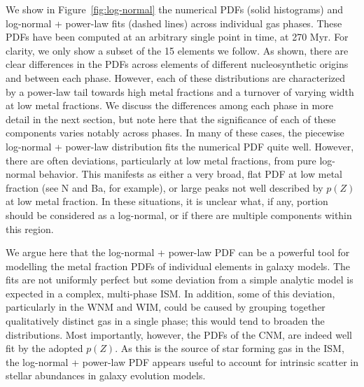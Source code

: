 \documentclass[twocolumn]{aastex61}
\begin{document}
We show in Figure~\ref{fig:log-normal} the numerical PDFs (solid histograms) and log-normal + power-law fits (dashed lines) across individual gas phases. These PDFs have been computed at an arbitrary single point in time, at 270 Myr. For clarity, we only show a subset of the 15 elements we follow. As shown, there are clear differences in the PDFs across elements of different nucleosynthetic origins and between each phase. However, each of these distributions are characterized by a power-law tail towards high metal fractions and a turnover of varying width at low metal fractions. We discuss the differences among each phase in more detail in the next section, but note here that the significance of each of these components varies notably across phases. In many of these cases, the piecewise log-normal + power-law distribution fits the numerical PDF quite well. However, there are often deviations, particularly at low metal fractions, from pure log-normal behavior. This manifests as either a very broad, flat PDF at low metal fraction (see N and Ba, for example), or large peaks not well described by $p(Z)$ at low metal fraction. In these situations, it is unclear what, if any, portion should be considered as a log-normal, or if there are multiple components within this region.

We argue here that the log-normal + power-law PDF can be a powerful tool for modelling the metal fraction  PDFs of individual elements in galaxy models. The fits are not uniformly perfect but some deviation from a simple analytic model is expected in a complex, multi-phase ISM. In addition, some of this deviation, particularly in the WNM and WIM, could be caused by grouping together qualitatively distinct gas in a single phase; this would tend to broaden the distributions. Most importantly, however, the PDFs of the CNM, are indeed well fit by the adopted $p(Z)$. As this is the source of star forming gas in the ISM, the log-normal + power-law PDF appears useful to account for intrinsic scatter in stellar abundances in galaxy evolution models.
\end{document}
